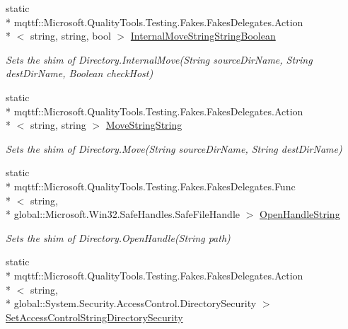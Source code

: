 \begin{DoxyCompactItemize}
static \\*
mqttf\-::\-Microsoft.\-Quality\-Tools.\-Testing.\-Fakes.\-Fakes\-Delegates.\-Action\\*
$<$ string, string, bool $>$ \hyperlink{class_system_1_1_i_o_1_1_fakes_1_1_shim_directory_aa5254495e22c76168fcec80c75ea5591}{Internal\-Move\-String\-String\-Boolean}
\begin{DoxyCompactList}\small\item\em Sets the shim of Directory.\-Internal\-Move(\-String source\-Dir\-Name, String dest\-Dir\-Name, Boolean check\-Host)\end{DoxyCompactList}\item 
static \\*
mqttf\-::\-Microsoft.\-Quality\-Tools.\-Testing.\-Fakes.\-Fakes\-Delegates.\-Action\\*
$<$ string, string $>$ \hyperlink{class_system_1_1_i_o_1_1_fakes_1_1_shim_directory_aaed2984a84b57b807c87c65a771fb34e}{Move\-String\-String}
\begin{DoxyCompactList}\small\item\em Sets the shim of Directory.\-Move(\-String source\-Dir\-Name, String dest\-Dir\-Name)\end{DoxyCompactList}\item 
static \\*
mqttf\-::\-Microsoft.\-Quality\-Tools.\-Testing.\-Fakes.\-Fakes\-Delegates.\-Func\\*
$<$ string, \\*
global\-::\-Microsoft.\-Win32.\-Safe\-Handles.\-Safe\-File\-Handle $>$ \hyperlink{class_system_1_1_i_o_1_1_fakes_1_1_shim_directory_adea9a4c704576ff74b0154ef7045868c}{Open\-Handle\-String}
\begin{DoxyCompactList}\small\item\em Sets the shim of Directory.\-Open\-Handle(\-String path)\end{DoxyCompactList}\item 
static \\*
mqttf\-::\-Microsoft.\-Quality\-Tools.\-Testing.\-Fakes.\-Fakes\-Delegates.\-Action\\*
$<$ string, \\*
global\-::\-System.\-Security.\-Access\-Control.\-Directory\-Security $>$ \hyperlink{class_system_1_1_i_o_1_1_fakes_1_1_shim_directory_a50127b56a9555568d66a48860401097c}{Set\-Access\-Control\-String\-Directory\-Security}

\end{DoxyCompactItemize}
